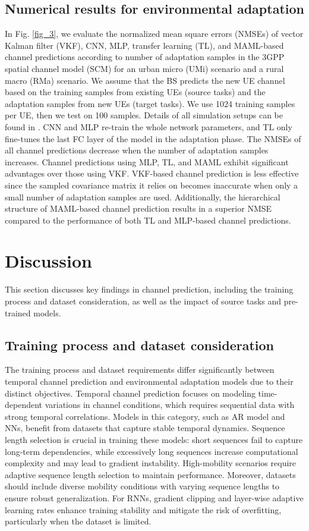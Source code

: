 \documentclass[lettersize,journal]{IEEEtran}
\begin{document}
\subsection{Numerical results for environmental adaptation}
In Fig. \ref{fig_3}, we evaluate the normalized mean square errors (NMSEs) of vector Kalman filter (VKF), CNN, MLP, transfer learning (TL), and MAML-based channel predictions according to number of adaptation samples in the 3GPP spatial channel model (SCM) for an urban micro (UMi) scenario and a rural macro (RMa) scenario.  We assume that the BS predicts the new UE channel based on the training samples from existing UEs (source tasks) and the adaptation samples from new UEs (target tasks). We use 1024 training samples per UE, then we test on 100 samples. Details of all simulation setups can be found in \cite{Kim23}. CNN and MLP re-train the whole network parameters, and TL only fine-tunes the last FC layer of the model in the adaptation phase. The NMSEs of all channel predictions decrease when the number of adaptation samples increases. Channel predictions using MLP, TL, and MAML exhibit significant advantages over those using VKF. VKF-based channel prediction is less effective since the sampled covariance matrix it relies on becomes inaccurate when only a small number of adaptation samples are used. Additionally, the hierarchical structure of MAML-based channel prediction results in a superior NMSE compared to the performance of both TL and MLP-based channel predictions.

\section{Discussion}
This section discusses key findings in channel prediction, including the training process and dataset consideration, as well as the impact of source tasks and pre-trained models.
\subsection{Training process and dataset consideration}
The training process and dataset requirements differ significantly between temporal channel prediction and environmental adaptation models due to their distinct objectives. Temporal channel prediction focuses on modeling time-dependent variations in channel conditions, which requires sequential data with strong temporal correlations. Models in this category, such as AR model and NNs, benefit from datasets that capture stable temporal dynamics. Sequence length selection is crucial in training these models: short sequences fail to capture long-term dependencies, while excessively long sequences increase computational complexity and may lead to gradient instability. High-mobility scenarios require adaptive sequence length selection to maintain performance. Moreover, datasets should include diverse mobility conditions with varying sequence lengths to ensure robust generalization. For RNNs, gradient clipping and layer-wise adaptive learning rates enhance training stability and mitigate the risk of overfitting, particularly when the dataset is limited.
\end{document}
